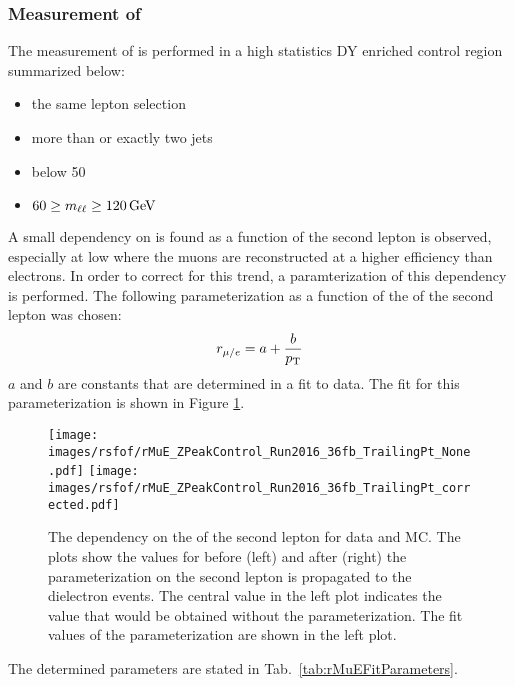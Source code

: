 \subsubsection*{Measurement of \rmue}
\noindent
\justify
The measurement of \rmue is performed in a high statistics DY enriched control region summarized below:
\begin{itemize}
    \item the same lepton selection
    \item more than or exactly two jets
    \item \ptmiss below 50\GeV
    \item $60\geq m_{\ell\ell}\geq120\,\text{Ge\hspace{-.08em}V}$
\end{itemize}                                 
A small dependency on \rmue is found as a function of the second lepton \pt is observed, especially at low \pt where the muons are reconstructed at a higher efficiency than electrons.  
In order to correct for this trend, a paramterization of this dependency is performed. The following parameterization as a function of the \pt of the second lepton was chosen:
\begin{equation}
    r_{\mu/e}  = a +  \frac{b}{p_{\mathrm{T}}}
\label{eq:rMuEFormular}
\end{equation}
$a$ and $b$ are constants that are determined in a fit to data.
The fit for this parameterization is shown in Figure \ref{fig:rMuEDependency}.
\begin{figure}[htbp!]
\begin{center}
    \texttt{[image: images/rsfof/rMuE\_ZPeakControl\_Run2016\_36fb\_TrailingPt\_None.pdf]}
    \texttt{[image: images/rsfof/rMuE\_ZPeakControl\_Run2016\_36fb\_TrailingPt\_corrected.pdf]}
    \caption{The \rmue dependency on the \pt of the second lepton for data and MC. The plots show the values for \rmue before (left) and after (right) the parameterization on the second lepton \pt is propagated to the dielectron events. The central value in the left plot indicates the \rmue value that would be obtained without the parameterization. The fit values of the parameterization are shown in the left plot.}
\label{fig:rMuEDependency}
\end{center}
\end{figure}                                                                                                                
The determined parameters are stated in Tab.~\ref{tab:rMuEFitParameters}.
